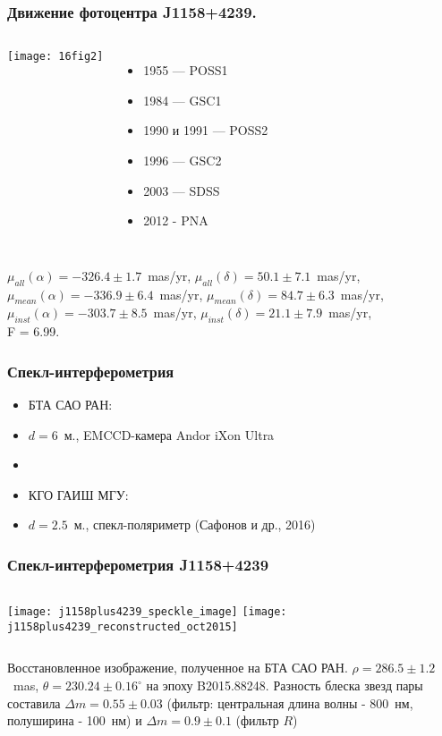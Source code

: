 \begin{frame}
\frametitle{Движение фотоцентра J1158+4239.}
\begin{columns}
	\begin{center}
	\texttt{[image: 16fig2]}
	\end{center}
	{\scriptsize 
		\begin{itemize}
		\item[] 1955 --- POSS1
		\item[] 1984 --- GSC1
		\item[] 1990 и 1991 --- POSS2
		\item[] 1996 --- GSC2
		\item[] 2003 --- SDSS
		\item[] 2012 - PNA
		\end{itemize}
	}
\end{columns}
\begin{center}
{\scriptsize $\mu_{all}(\alpha)=-326.4\pm 1.7$~mas/yr, $\mu_{all}(\delta)=50.1\pm 7.1$~mas/yr, $\mu_{mean}(\alpha)=-336.9\pm 6.4$~mas/yr, $\mu_{mean}(\delta)=84.7\pm 6.3$~mas/yr, $\mu_{inst}(\alpha)=-303.7\pm 8.5$~mas/yr, $\mu_{inst}(\delta)=21.1\pm 7.9$~mas/yr,\\ F = 6.99.}
\end{center}
\end{frame}

\begin{frame}
\frametitle{Спекл-интерферометрия}
\begin{itemize}
\item[] БТА САО РАН:
\item[] $d=6$~м., EMCCD-камера Andor iXon Ultra
\item[] 
\item[] КГО ГАИШ МГУ:
\item[] $d=2.5$~м., спекл-поляриметр (Сафонов и др., 2016)
\end{itemize}
\end{frame}


\begin{frame}
\frametitle{Спекл-интерферометрия J1158+4239}
\begin{center}
\begin{columns}
	\texttt{[image: j1158plus4239\_speckle\_image]}
	\texttt{[image: j1158plus4239\_reconstructed\_oct2015]}
\end{columns}
\end{center}
{\footnotesize 
	Восстановленное изображение, полученное на БТА САО РАН. $\rho = 286.5\pm1.2$~mas, $\theta=230.24  \pm 0.16^{\circ}$ на эпоху B2015.88248. Разность блеска звезд пары составила $\Delta m = 0.55\pm 0.03$ (фильтр: центральная длина волны - 800~нм, полуширина - 100~нм) и $\Delta m = 0.9\pm 0.1$ (фильтр $R$)
}
\end{frame}

